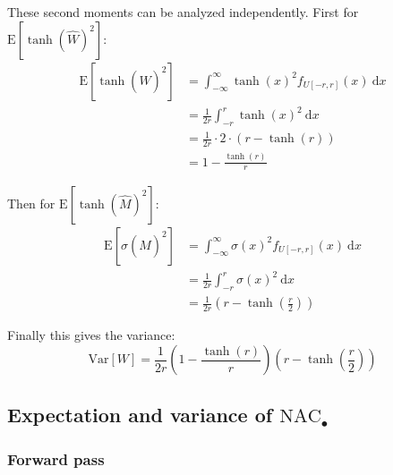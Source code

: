 These second moments can be analyzed independently. First for $\mathrm{E}[\tanh(\hat{W})^2]$:
\begin{equation}
\begin{aligned}
\mathrm{E}[\tanh(\hat{W})^2] &= \int_{-\infty}^{\infty} \tanh(x)^2 f_{U[-r, r]}(x)\ \mathrm{d}x \\
&= \frac{1}{2r} \int_{-r}^{r} \tanh(x)^2\ \mathrm{d}x \\
&= \frac{1}{2r} \cdot 2 \cdot (r - \tanh(r)) \\
&= 1 - \frac{\tanh(r)}{r}
\end{aligned}
\end{equation}

Then for $\mathrm{E}[\tanh(\hat{M})^2]$:
\begin{equation}
\begin{aligned}
\mathrm{E}[\sigma(\hat{M})^2] &= \int_{-\infty}^{\infty} \sigma(x)^2 f_{U[-r, r]}(x)\ \mathrm{d}x \\
&= \frac{1}{2r} \int_{-r}^{r} \sigma(x)^2\ \mathrm{d}x \\
&= \frac{1}{2r} \left(r - \tanh\left(\frac{r}{2}\right)\right)
\end{aligned}
\end{equation}

Finally this gives the variance:
\begin{equation}
\mathrm{Var}[W] = \frac{1}{2r} \left(1 - \frac{\tanh(r)}{r}\right) \left(r - \tanh\left(\frac{r}{2}\right)\right)
\end{equation}

\subsection{Expectation and variance of $\mathrm{NAC}_{\bullet}$}
\label{sec:appendix:moments:nac-mul}
\subsubsection{Forward pass}

